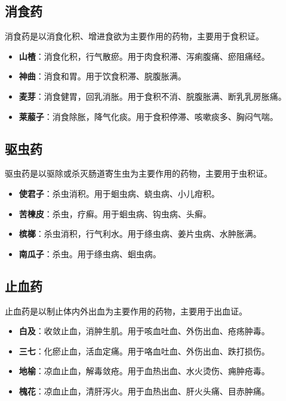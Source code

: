 \documentclass[12pt,UTF8]{ctexbook}
\begin{document}
\subsection{消食药}

消食药是以消食化积、增进食欲为主要作用的药物，主要用于食积证。

\begin{itemize}
\item \textbf{山楂}：消食化积，行气散瘀。用于肉食积滞、泻痢腹痛、瘀阻痛经。
\item \textbf{神曲}：消食和胃。用于饮食积滞、脘腹胀满。
\item \textbf{麦芽}：消食健胃，回乳消胀。用于食积不消、脘腹胀满、断乳乳房胀痛。
\item \textbf{莱菔子}：消食除胀，降气化痰。用于食积停滞、咳嗽痰多、胸闷气喘。
\end{itemize}

\subsection{驱虫药}

驱虫药是以驱除或杀灭肠道寄生虫为主要作用的药物，主要用于虫积证。

\begin{itemize}
\item \textbf{使君子}：杀虫消积。用于蛔虫病、蛲虫病、小儿疳积。
\item \textbf{苦楝皮}：杀虫，疗癣。用于蛔虫病、钩虫病、头癣。
\item \textbf{槟榔}：杀虫消积，行气利水。用于绦虫病、姜片虫病、水肿胀满。
\item \textbf{南瓜子}：杀虫。用于绦虫病、蛔虫病。
\end{itemize}

\subsection{止血药}

止血药是以制止体内外出血为主要作用的药物，主要用于出血证。

\begin{itemize}
\item \textbf{白及}：收敛止血，消肿生肌。用于咳血吐血、外伤出血、疮疡肿毒。
\item \textbf{三七}：化瘀止血，活血定痛。用于咯血吐血、外伤出血、跌打损伤。
\item \textbf{地榆}：凉血止血，解毒敛疮。用于血热出血、水火烫伤、痈肿疮毒。
\item \textbf{槐花}：凉血止血，清肝泻火。用于血热出血、肝火头痛、目赤肿痛。
\end{itemize}
\end{document}

